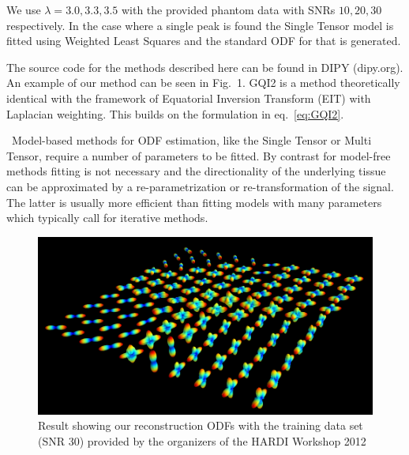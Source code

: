 \documentclass[9pt,conference,a4paper]{IEEEtran}
\begin{document}
We use $\lambda=3.0, 3.3, 3.5$ with the provided phantom data with SNRs $10, 20, 30$
respectively. In the case where a single peak is found the Single
Tensor model is fitted using Weighted Least Squares and the standard
ODF for that is generated. 



The source code for the methods described here can be found in DIPY
(dipy.org).  An example of our method can be seen in Fig.~1.  GQI2 is a
method theoretically identical with the framework of Equatorial
Inversion Transform (EIT) \cite{Garyfallidis_thesis} with Laplacian
weighting. This builds on the formulation in eq.~\ref{eq:GQI2}.

\noindent~Model-based methods for ODF estimation, like the Single Tensor
or Multi Tensor, require a number of parameters to be fitted. By
contrast for model-free methods fitting is not necessary and the
directionality of the underlying tissue can be approximated by a
re-parametrization or re-transformation of the signal. The latter is
usually more efficient than fitting models with many parameters which
typically call for iterative methods.

%
\begin{figure}
\begin{centering}
\includegraphics{hardi_isbi2012/isbi2012}
\end{centering}
\caption{Result showing our reconstruction ODFs with the training data set
(SNR 30) provided by the organizers of the HARDI Workshop 2012}
\end{figure}
\end{document}

